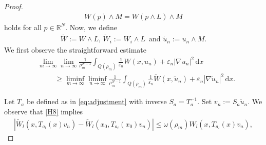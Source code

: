 \documentclass[a4paper, 11pt, reqno]{amsart}
\theoremstyle{plain}
\theoremstyle{definition}
\theoremstyle{remark}
\newcommand{\R}{\mathbb R}
\newcommand{\eps}{\varepsilon}
\begin{document}
\begin{proof}
    \begin{align*}
        W(p) \land M = W(p \land L) \land M
    \end{align*}
    holds for all $p \in \R^N$.  Now, we define 
    \begin{align*}
        \widetilde W := W \land L, \, \widetilde W_i := W_i \land L\, \text{ and }\tilde u_n := u_n \land M.
    \end{align*}
    We first observe the straightforward estimate
    \begin{align}\label{eq:liminf_partial_inequality_1}
        &\lim_{m \to \infty} \lim_{n \to \infty} \frac{1}{\rho_m^{N-1} }\int_{Q(\rho_m)} \frac{1}{\eps_n}W(x, u_n) + \eps_n |\nabla u_n|^2 \, \mathrm{d}x  \nonumber \\
        & \hspace{1cm} \geq \liminf_{m \to \infty} \liminf_{n \to \infty} \frac{1}{\rho_m^{N-1} }\int_{Q(\rho_m)} \frac{1}{\eps_n}\widetilde W(x, \tilde u_n) + \eps_n |\nabla \tilde u_n|^2 \, \mathrm{d}x.
    \end{align}
    
    Let $T_a$ be defined as in \eqref{eq:adjustment} with inverse $S_a = T_a^{-1}$. Set $v_n := S_a \tilde u_n$. We observe that \ref{H8} implies
    \begin{align}\label{eq:relative_continuity_cond_bounded}
        |\widetilde W_l(x, T_{a_l}(x)v_n) - \widetilde W_l(x_0, T_{a_l}(x_0) v_n)| \leq \omega(\rho_m)W_l(x, T_{a_l}(x)v_n),
    \end{align}
        

\end{proof}
\end{document}
